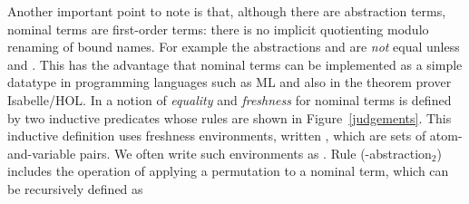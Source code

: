 \begin{isabellebody}
\begin{isamarkuptext}
  Another important point to note is that, although there are abstraction terms,
  nominal terms are first-order terms: there is no implicit 
  quotienting modulo renaming of bound names. For example the abstractions
   and  are \emph{not} equal unless  and .
  This has the advantage that nominal terms can be implemented as a simple
  datatype  in programming languages such as ML and also in the theorem prover Isabelle/HOL.
  In \cite{UrbanPittsGabbay04} a notion of \emph{equality} and \emph{freshness} 
  for nominal terms is defined by two inductive predicates whose rules are shown in 
  Figure~\ref{judgements}. This inductive definition uses freshness environments, written 
  , which are sets of atom-and-variable pairs. We often write such environments as
  . Rule (-abstraction$_2$) includes the operation of 
  applying a permutation to a nominal term, which can be recursively defined as


\end{isamarkuptext}
\end{isabellebody}
